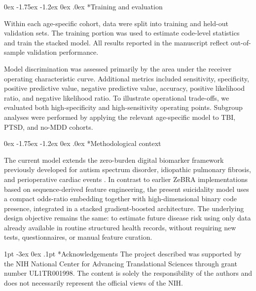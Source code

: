 \documentclass[onecolumn, compsoc,11pt]{IEEEtran}
\makeatletter
\renewcommand\section{\@startsection {section}{1}{\z@}
  {1pt \@plus -3ex \@minus 0ex}
  {.1pt}
  {\large\bfseries\scshape\color{black!70}}}
\renewcommand\subsection{\@startsection {subsection}{2}{\z@}
  {0ex \@plus -1.75ex \@minus -1.2ex}
  {0ex \@plus.0ex}
  {\fontsize{11}{11}\selectfont\bfseries\sffamily}}
\makeatother
\begin{document}
\subsection*{Training and evaluation}

Within each age-specific cohort, data were split into training and held-out validation sets. The training portion was used to estimate code-level statistics and train the stacked model. All results reported in the manuscript reflect out-of-sample validation performance.

Model discrimination was assessed primarily by the area under the receiver operating characteristic curve. Additional metrics included sensitivity, specificity, positive predictive value, negative predictive value, accuracy, positive likelihood ratio, and negative likelihood ratio. To illustrate operational trade-offs, we evaluated both high-specificity and high-sensitivity operating points. Subgroup analyses were performed by applying the relevant age-specific model to TBI, PTSD, and no-MDD cohorts.


\subsection*{Methodological context}

The current model extends the zero-burden digital biomarker framework previously developed for autism spectrum disorder, idiopathic pulmonary fibrosis, and perioperative cardiac events \cite{onishchenko2021reduced,onishchenko2022screening,JAHA2022}. In contrast to earlier ZeBRA implementations based on sequence-derived feature engineering, the present suicidality model uses a compact odds-ratio embedding together with high-dimensional binary code presence, integrated in a stacked gradient-boosted architecture. The underlying design objective remains the same: to estimate future disease risk using only data already available in routine structured health records, without requiring new tests, questionnaires, or manual feature curation.














\section*{Acknowledgements}
The project described was supported by the NIH National Center for Advancing Translational Sciences through grant number UL1TR001998.  The content is solely the responsibility of the authors and does not necessarily represent the official views of the NIH.
\end{document}

